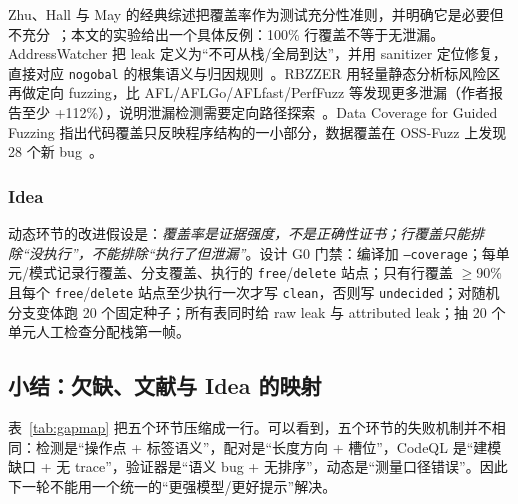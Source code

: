 \documentclass[conference]{IEEEtran}
\begin{document}
Zhu、Hall 与 May 的经典综述把覆盖率作为测试充分性准则，并明确它是必要但不充分~\cite{zhu1997coverage}；本文的实验给出一个具体反例：100\% 行覆盖不等于无泄漏。AddressWatcher 把 leak 定义为“不可从栈/全局到达”，并用 sanitizer 定位修复，直接对应 \texttt{nogobal} 的根集语义与归因规则~\cite{murali2024addresswatcher}。RBZZER 用轻量静态分析标风险区再做定向 fuzzing，比 AFL/AFLGo/AFLfast/PerfFuzz 等发现更多泄漏（作者报告至少 +112\%），说明泄漏检测需要定向路径探索~\cite{peng2025rbzzer}。Data Coverage for Guided Fuzzing 指出代码覆盖只反映程序结构的一小部分，数据覆盖在 OSS-Fuzz 上发现 28 个新 bug~\cite{wang2024datacoverage}。

\subsubsection{Idea}

动态环节的改进假设是：\emph{覆盖率是证据强度，不是正确性证书；行覆盖只能排除“没执行”，不能排除“执行了但泄漏”}。设计 G0 门禁：编译加 \texttt{--coverage}；每单元/模式记录行覆盖、分支覆盖、执行的 \texttt{free}/\texttt{delete} 站点；只有行覆盖 $\ge$90\% 且每个 \texttt{free}/\texttt{delete} 站点至少执行一次才写 \texttt{clean}，否则写 \texttt{undecided}；对随机分支变体跑 20 个固定种子；所有表同时给 raw leak 与 attributed leak；抽 20 个单元人工检查分配栈第一帧。

\subsection{小结：欠缺、文献与 Idea 的映射}

表~\ref{tab:gapmap} 把五个环节压缩成一行。可以看到，五个环节的失败机制并不相同：检测是“操作点 + 标签语义”，配对是“长度方向 + 槽位”，CodeQL 是“建模缺口 + 无 trace”，验证器是“语义 bug + 无排序”，动态是“测量口径错误”。因此下一轮不能用一个统一的“更强模型/更好提示”解决。
\end{document}
